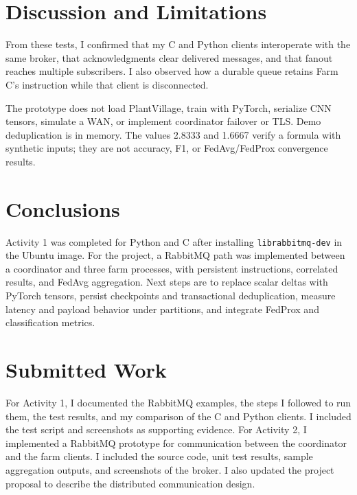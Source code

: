 ﻿\documentclass[11pt,a4paper]{article}
\begin{document}
\section{Discussion and Limitations}From these tests, I confirmed that my C and Python clients interoperate with the same broker, that acknowledgments clear delivered messages, and that fanout reaches multiple subscribers. I also observed how a durable queue retains Farm C's instruction while that client is disconnected.

The prototype does not load PlantVillage, train with PyTorch, serialize CNN tensors, simulate a WAN, or implement coordinator failover or TLS. Demo deduplication is in memory. The values 2.8333 and 1.6667 verify a formula with synthetic inputs; they are not accuracy, F1, or FedAvg/FedProx convergence results.
\section{Conclusions}Activity 1 was completed for Python and C after installing \texttt{librabbitmq-dev} in the Ubuntu image. For the project, a RabbitMQ path was implemented between a coordinator and three farm processes, with persistent instructions, correlated results, and FedAvg aggregation. Next steps are to replace scalar deltas with PyTorch tensors, persist checkpoints and transactional deduplication, measure latency and payload behavior under partitions, and integrate FedProx and classification metrics.
\section*{Submitted Work}
For Activity 1, I documented the RabbitMQ examples, the steps I followed to run them, the test results, and my comparison of the C and Python clients. I included the test script and screenshots as supporting evidence. For Activity 2, I implemented a RabbitMQ prototype for communication between the coordinator and the farm clients. I included the source code, unit test results, sample aggregation outputs, and screenshots of the broker. I also updated the project proposal to describe the distributed communication design.
\end{document}
